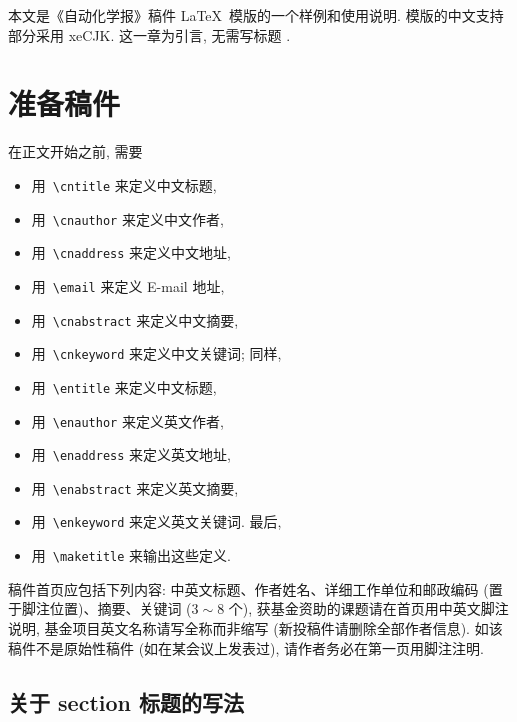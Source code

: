 \documentclass{aas}
\begin{document}
\pagestyle{aasheadings}




本文是《自动化学报》稿件 \LaTeX\ 模版的一个样例和使用说明.
模版的中文支持部分采用 \textsf{xeCJK}. 这一章为引言, 无需写标题 \cite{1}.


\section{准备稿件}

在正文开始之前, 需要%
\begin{itemize}
  \item 用~\verb|\cntitle|    来定义中文标题,
  \item 用~\verb|\cnauthor|   来定义中文作者,
  \item 用~\verb|\cnaddress|  来定义中文地址,
  \item 用~\verb|\email|      来定义 E-mail 地址,
  \item 用~\verb|\cnabstract| 来定义中文摘要,
  \item 用~\verb|\cnkeyword|  来定义中文关键词; 同样,
  \item 用~\verb|\entitle|    来定义中文标题,
  \item 用~\verb|\enauthor|   来定义英文作者,
  \item 用~\verb|\enaddress|  来定义英文地址,
  \item 用~\verb|\enabstract| 来定义英文摘要,
  \item 用~\verb|\enkeyword|  来定义英文关键词. 最后,
  \item 用~\verb|\maketitle|  来输出这些定义.
\end{itemize}

稿件首页应包括下列内容: 中英文标题、作者姓名、详细工作单位和邮政编码 (置于脚注位置)、摘要、关键词 ($3 \sim 8$ 个), 获基金资助的课题请在首页用中英文脚注说明, 基金项目英文名称请写全称而非缩写 (新投稿件请删除全部作者信息). 如该稿件不是原始性稿件 (如在某会议上发表过), 请作者务必在第一页用脚注注明.

\subsection{关于 \textbf{section} 标题的写法}
\end{document}
